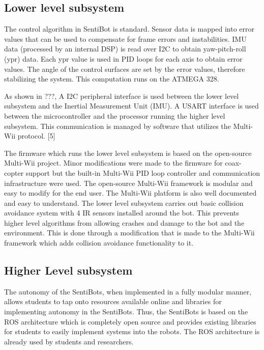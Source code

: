 \documentclass[12pt]{article}
\begin{document}
\subsection{Lower level subsystem}

The control algorithm in SentiBot is standard. Sensor data is mapped into error values that can be used to compensate for frame errors and instabilities. IMU data (processed by an internal DSP) is read over I2C to obtain yaw-pitch-roll (ypr) data. Each ypr value is used in PID loops for each axis to obtain error values. The angle of the control surfaces are set by the error values, therefore stabilizing the system. This computation runs on the ATMEGA 328.

As shown in ???, A I2C peripheral interface is used between the lower level subsystem and the Inertial Measurement Unit (IMU). A USART interface is used between the microcontroller and the processor running the higher level subsystem. This communication is managed by software that utilizes the Multi-Wii protocol. [5]

The firmware which runs the lower level subsystem is based on the open-source Multi-Wii project. Minor modifications were made to the firmware for coax-copter support but the built-in Multi-Wii PID loop controller and communication infrastructure were used. The open-source Multi-Wii framework is modular and easy to modify for the end user. The Multi-Wii platform is also well documented and easy to understand. The lower level subsystem carries out basic collision avoidance system with 4 IR sensors installed around the bot. This prevents higher level algorithms from allowing crashes and damage to the bot and the environment. This is done through a modification that is made to the Multi-Wii framework which adds collision avoidance functionality to it.

\subsection{Higher Level subsystem}

The autonomy of the SentiBots, when implemented in a fully modular manner, allows students to tap onto resources available online and libraries for implementing autonomy in the SentiBots. Thus, the SentiBots is based on the ROS architecture which is completely open source and provides existing libraries for students to easily implement systems into the robots. The ROS architecture is already used by students and researchers.
\end{document}
